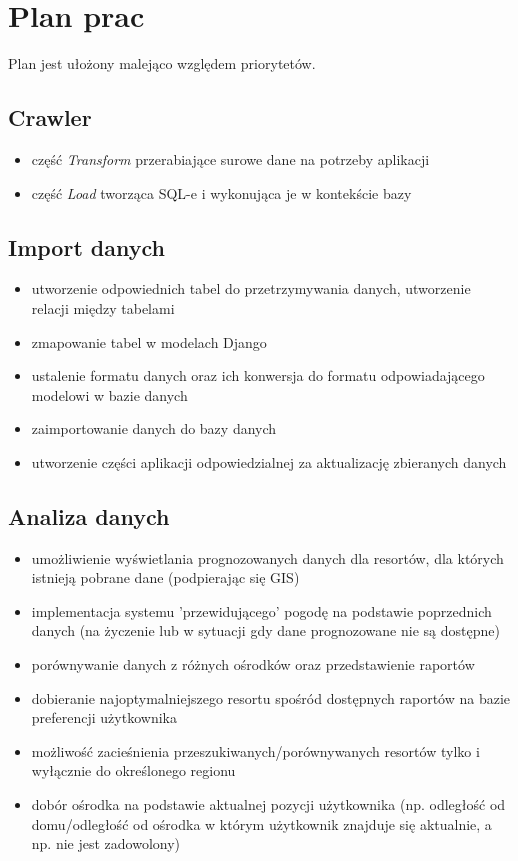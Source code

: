 \documentclass[12pt]{article}
\begin{document}
\section{Plan prac}
Plan jest ułożony malejąco względem priorytetów.
\subsection{Crawler}
\begin{itemize}
  \item część \emph{Transform} przerabiające surowe dane na potrzeby aplikacji
  \item część \emph{Load} tworząca SQL-e i wykonująca je w kontekście bazy
\end{itemize}

\subsection{Import danych}
\begin{itemize}
  \item utworzenie odpowiednich tabel do przetrzymywania danych, utworzenie relacji między tabelami
  \item zmapowanie tabel w modelach Django
  \item ustalenie formatu danych oraz ich konwersja do formatu odpowiadającego modelowi w bazie danych
  \item zaimportowanie danych do bazy danych
  \item utworzenie części aplikacji odpowiedzialnej za aktualizację zbieranych danych
\end{itemize}

\subsection{Analiza danych}
\begin{itemize}
  \item umożliwienie wyświetlania prognozowanych danych dla resortów, dla których istnieją pobrane dane
        (podpierając się GIS)
  \item implementacja systemu 'przewidującego' pogodę na podstawie poprzednich danych (na życzenie lub w
        sytuacji gdy dane prognozowane nie są dostępne)
  \item porównywanie danych z różnych ośrodków oraz przedstawienie raportów
  \item dobieranie najoptymalniejszego resortu spośród dostępnych raportów na bazie preferencji użytkownika
  \item możliwość zacieśnienia przeszukiwanych/porównywanych resortów tylko i wyłącznie do określonego regionu
  \item dobór ośrodka na podstawie aktualnej pozycji użytkownika (np. odległość od domu/odległość od ośrodka
        w którym użytkownik znajduje się aktualnie, a np. nie jest zadowolony)
\end{itemize}
\end{document}
